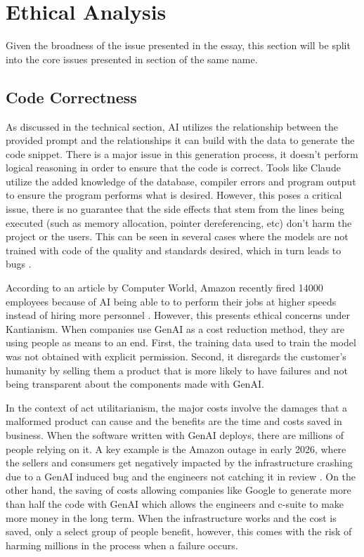 \section{Ethical Analysis}
Given the broadness of the issue presented in the essay, this section will be split into the core issues presented in section of the same name.

\subsection{Code Correctness}
As discussed in the technical section, AI utilizes the relationship between the provided prompt and the relationships it can build with the data to generate the code snippet. There is a major issue in this generation process, it doesn't perform logical reasoning in order to ensure that the code is correct. Tools like Claude utilize the added knowledge of the database, compiler errors and program output to ensure the program performs what is desired. However, this poses a critical issue, there is no guarantee that the side effects that stem from the lines being executed (such as memory allocation, pointer dereferencing, etc) don't harm the project or the users. This can be seen in several cases where the models are not trained with code of the quality and standards desired, which in turn leads to bugs \cite{ai-bugs-paper}.

According to an article by Computer World, Amazon recently fired 14000 employees because of AI being able to to perform their jobs at higher speeds instead of hiring more personnel \cite{amazon-ai-layoffs}. However, this presents ethical concerns under Kantianism. When companies use GenAI as a cost reduction method, they are using people as means to an end. First, the training data used to train the model was not obtained with explicit permission. Second, it disregards the customer's humanity by selling them a product that is more likely to have failures and not being transparent about the components made with GenAI.

In the context of act utilitarianism, the major costs involve the damages that a malformed product can cause and the benefits are the time and costs saved in business. When the software written with GenAI deploys, there are millions of people relying on it. A key example is the Amazon outage in early 2026, where the sellers and consumers get negatively impacted by the infrastructure crashing due to a GenAI induced bug and the engineers not catching it in review \cite{amazon-ai-guard-rails}. On the other hand, the saving of costs allowing companies like Google to generate more than half the code with GenAI \cite{google-ai-use} which allows the engineers and c-suite to make more money in the long term. When the infrastructure works and the cost is saved, only a select group of people benefit, however, this comes with the risk of harming millions in the process when a failure occurs.


